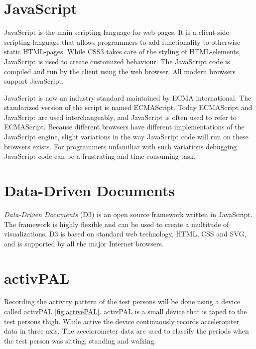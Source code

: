 \section{JavaScript}
JavaScript is the main scripting language for web pages. It is a client-side scripting language that allows programmers to add functionality to otherwise static HTML-pages. While CSS3 takes care of the styling of HTML-elements, JavaScript is used to create customized behaviour. The JavaScript code is compiled and run by the client using the web browser. All modern browsers support JavaScript.

JavaScript is now an industry standard maintained by ECMA international. The standarized version of the script is named ECMAScript. Today ECMAScript and JavaScript are used interchangeably, and JavaScript is often used to refer to ECMAScript. Because different browsers have different implementations of the JavaScript engine, slight variations in the way JavaScript code will run on these browsers exists. For programmers unfamiliar with such variations debugging JavaScript code can be a frustrating and time consuming task.
      
\section{Data-Driven Documents}
\emph{Data-Driven Documents} (D3) is an open source framework written in JavaScript. The framework is highly flexible and can be used to create a multitude of visualizations. D3 is based on standard web technology, HTML, CSS and SVG, and is supported by all the major Internet browsers.


\section{activPAL}
Recording the activity pattern of the test persons will be done using a device called activPAL \ref{fig:activePAL}. activPAL is a small device that is taped to the test persons thigh. While active the device continuously records acceleromter data in three axis. The accelorometer data are used to classify the periods when the test person was sitting, standing and walking.

